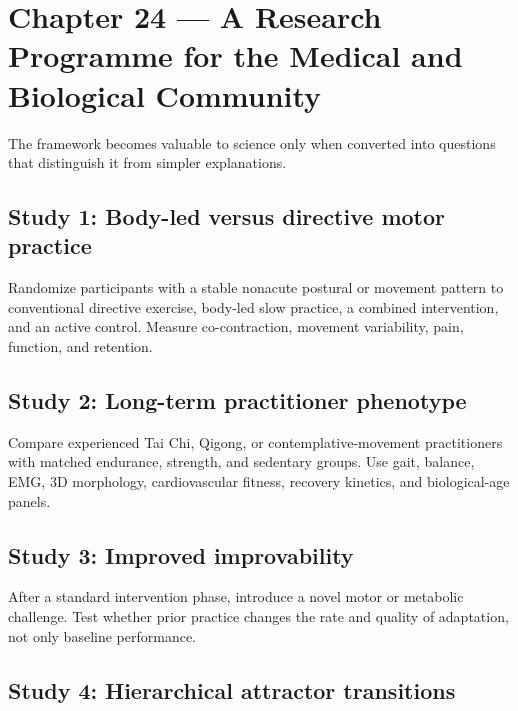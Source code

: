 \chapter{Chapter 24 --- A Research Programme for the Medical and Biological Community}\label{chapter-24-a-research-programme-for-the-medical-and-biological-community}

The framework becomes valuable to science only when converted into questions that distinguish it from simpler explanations.

\section{Study 1: Body-led versus directive motor practice}\label{study-1-body-led-versus-directive-motor-practice}

Randomize participants with a stable nonacute postural or movement pattern to conventional directive exercise, body-led slow practice, a combined intervention, and an active control. Measure co-contraction, movement variability, pain, function, and retention.

\section{Study 2: Long-term practitioner phenotype}\label{study-2-long-term-practitioner-phenotype}

Compare experienced Tai Chi, Qigong, or contemplative-movement practitioners with matched endurance, strength, and sedentary groups. Use gait, balance, EMG, 3D morphology, cardiovascular fitness, recovery kinetics, and biological-age panels.

\section{Study 3: Improved improvability}\label{study-3-improved-improvability}

After a standard intervention phase, introduce a novel motor or metabolic challenge. Test whether prior practice changes the rate and quality of adaptation, not only baseline performance.

\section{Study 4: Hierarchical attractor transitions}\label{study-4-hierarchical-attractor-transitions}

